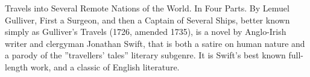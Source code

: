 \label{ch:abstract}


Travels into Several Remote Nations of the World. In Four Parts. By Lemuel Gulliver, First a Surgeon, and then a Captain of Several Ships, better known simply as Gulliver's Travels (1726, amended 1735), is a novel by Anglo-Irish writer and clergyman Jonathan Swift, that is both a satire on human nature and a parody of the ''travellers' tales'' literary subgenre. It is Swift's best known full-length work, and a classic of English literature.
